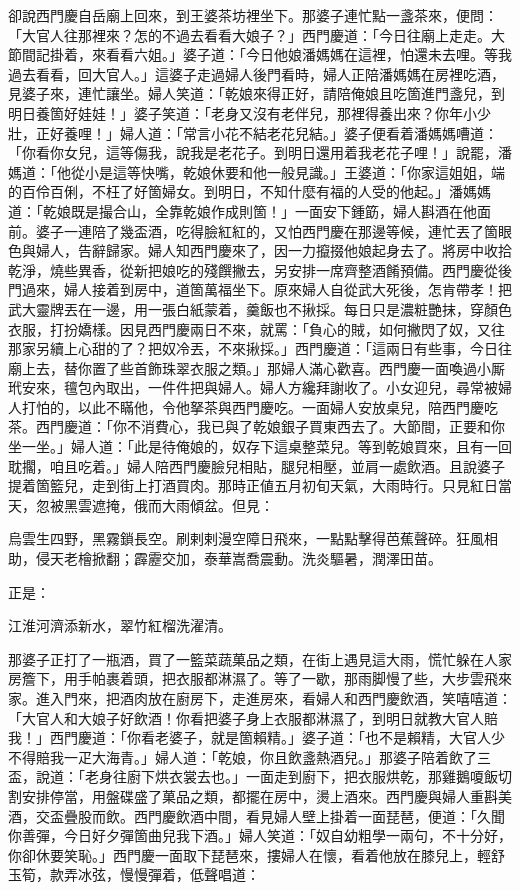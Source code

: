 卻說西門慶自岳廟上回來，到王婆茶坊裡坐下。那婆子連忙點一盞茶來，便問：「大官人往那裡來？怎的不過去看看大娘子？」西門慶道：「今日往廟上走走。大節間記掛着，來看看六姐。」婆子道：「今日他娘潘媽媽在這裡，怕還未去哩。等我過去看看，回大官人。」這婆子走過婦人後門看時，婦人正陪潘媽媽在房裡吃酒，見婆子來，連忙讓坐。婦人笑道：「乾娘來得正好，請陪俺娘且吃箇進門盞兒，到明日養箇好娃娃！」婆子笑道：「老身又沒有老伴兒，那裡得養出來？你年小少壯，正好養哩！」婦人道：「常言小花不結老花兒結。」婆子便看着潘媽媽嘈道：「你看你女兒，這等傷我，說我是老花子。到明日還用着我老花子哩！」{}說罷，潘媽道：「他從小是這等快嘴，乾娘休要和他一般見識。」王婆道：「你家這姐姐，端的百伶百俐，不枉了好箇婦女。到明日，不知什麼有福的人受的他起。」潘媽媽道：「乾娘既是撮合山，全靠乾娘作成則箇！」一面安下鍾筯，婦人斟酒在他面前。婆子一連陪了幾盃酒，吃得臉紅紅的，又怕西門慶在那邊等候，連忙丟了箇眼色與婦人，告辭歸家。婦人知西門慶來了，因一力攛掇他娘起身去了。將房中收拾乾淨，燒些異香，從新把娘吃的殘饌撇去，另安排一席齊整酒餚預備。西門慶從後門過來，婦人接着到房中，道箇萬福坐下。原來婦人自從武大死後，怎肯帶孝！把武大靈牌丟在一邊，{}用一張白紙蒙着，羹飯也不揪採。每日只是濃粧艷抹，穿顏色衣服，打扮嬌樣。因見西門慶兩日不來，就罵：「負心的賊，如何撇閃了奴，又往那家另續上心甜的了？把奴冷丟，不來揪採。」西門慶道：「這兩日有些事，今日往廟上去，替你置了些首飾珠翠衣服之類。」那婦人滿心歡喜。西門慶一面喚過小厮玳安來，氊包內取出，一件件把與婦人。婦人方纔拜謝收了。小女迎兒，尋常被婦人打怕的，以此不瞞他，令他拏茶與西門慶吃。一面婦人安放桌兒，陪西門慶吃茶。西門慶道：「你不消費心，我已與了乾娘銀子買東西去了。大節間，正要和你坐一坐。」婦人道：「此是待俺娘的，奴存下這桌整菜兒。等到乾娘買來，且有一回耽擱，咱且吃着。」婦人陪西門慶臉兒相貼，腿兒相壓，並肩一處飲酒。且說婆子提着箇籃兒，走到街上打酒買肉。那時正値五月初旬天氣，大雨時行。只見紅日當天，忽被黑雲遮掩，俄而大雨傾盆。但見：

\begin{myquote} 
烏雲生四野，黑霧鎖長空。刷剌剌漫空障日飛來，一點點擊得芭蕉聲碎。狂風相助，侵天老檜掀翻；霹靂交加，泰華嵩喬震動。洗炎驅暑，潤澤田苗。
\end{myquote} 

正是：

\begin{myquote} 
江淮河濟添新水，翠竹紅榴洗濯清。
\end{myquote} 

那婆子正打了一瓶酒，買了一籃菜蔬菓品之類，在街上遇見這大雨，慌忙躲在人家房簷下，用手帕裹着頭，把衣服都淋濕了。等了一歇，那雨脚慢了些，大步雲飛來家。進入門來，把酒肉放在廚房下，走進房來，看婦人和西門慶飲酒，笑嘻嘻道：「大官人和大娘子好飲酒！你看把婆子身上衣服都淋濕了，到明日就教大官人賠我！」西門慶道：「你看老婆子，就是箇賴精。」婆子道：「也不是賴精，大官人少不得賠我一疋大海青。」婦人道：「乾娘，你且飲盞熱酒兒。」那婆子陪着飲了三盃，說道：「老身往廚下烘衣裳去也。」一面走到廚下，把衣服烘乾，那雞鵝嗄飯切割安排停當，用盤碟盛了菓品之類，都擺在房中，燙上酒來。西門慶與婦人重斟美酒，交盃疊股而飲。西門慶飲酒中間，看見婦人壁上掛着一面琵琶，便道：「久聞你善彈，今日好夕彈箇曲兒我下酒。」婦人笑道：「奴自幼粗學一兩句，不十分好，你卻休要笑恥。」西門慶一面取下琵琶來，摟婦人在懷，看着他放在膝兒上，輕舒玉筍，款弄冰弦，慢慢彈着，低聲唱道：

